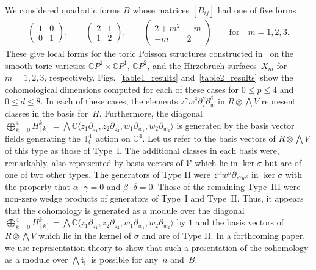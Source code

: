 \documentclass[pdftex]{sigma}
\numberwithin{equation}{section}
\begin{document}
We considered quadratic forms $B$ whose matrices $[B_{ij}]$ had one of f\/ive forms
\begin{gather*}
\begin{pmatrix}1 & 0 \\ 0 & 1\end{pmatrix},\qquad \begin{pmatrix}2 & 1 \\ 1 & 2\end{pmatrix},\qquad \begin{pmatrix}2+m^2 & -m \\ -m & 2\end{pmatrix}\qquad \text{for} \quad m=1,2,3.
\end{gather*}
These give local forms for the toric Poisson structures constructed in~\cite{Caine} on the smooth toric varieties ${\mathbb C} P^1\times {\mathbb C} P^1$, ${\mathbb C} P^2$, and the Hirzebruch surfaces~$X_m$ for $m=1,2,3$, respectively. Figs.~\ref{table1_results} and~\ref{table2_results} show the cohomological dimensions computed for each of these cases for $0\le p\le 4$ and $0\le d\le 8$. In each of these cases, the elements $z^\gamma w^\delta \partial_{z}^\gamma \partial_{w}^\delta$ in $R\otimes \bigwedge V$ represent classes in the basis for~$H$. Furthermore, the diagonal $\bigoplus_{k=0}^4 H_{[k]}^k=\bigwedge {\mathbb C}\langle z_1\partial_{z_1},z_2\partial_{z_2},w_1\partial_{w_1},w_2\partial_{w_2}\rangle$ is generated by the basis vector f\/ields generating the ${\mathbb T}_{\mathbb C}^{4}$ action on ${\mathbb C}^4$. Let us refer to the basis vectors of $R\otimes \bigwedge V$ of this type as those of Type~I. The additional classes in each basis were, remarkably, also represented by basis vectors of $\mathcal V$ which lie in $\ker\sigma$ but are of one of two other types. The generators of Type II were $z^\alpha w^\beta \partial_{z^\gamma w^\delta}$ in $\ker \sigma$ with the property that $\alpha\cdot\gamma=0$ and $\beta\cdot\delta=0$. Those of the remaining Type~III were non-zero wedge products of generators of Type~I and Type~II. Thus, it appears that the cohomology is generated as a module over the diagonal $\bigoplus_{k=0}^4 H_{[k]}^k=\bigwedge {\mathbb C}\langle z_1\partial_{z_1},z_2\partial_{z_2}, w_1\partial_{w_1}, w_2\partial_{w_2}\rangle$ by $1$ and the basis vectors of $R\otimes \bigwedge V$ which lie in the kernel of $\sigma$ and are of Type II. In a forthcoming paper, we use representation theory to show that such a presentation of the cohomology as a module over $\bigwedge {\mathfrak t}_{\mathbb C}$ is possible for any~$n$ and~$B$.
\end{document}
